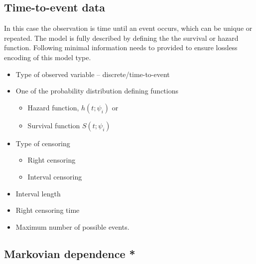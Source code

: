 %
%


\subsection{Time-to-event data}
In this case the observation is time until an event occurs, which can be unique or repeated.
The model is fully described by defining the the survival or hazard function. Following minimal information 
needs to provided to ensure lossless encoding of this model type.
\begin{itemize}
\item
Type of observed variable -- discrete/time-to-event
\item
One of the probability distribution defining functions
\begin{itemize}
\item
Hazard function, $h(t; \psi_i)$ or
\item
Survival function $S(t;\psi_i)$
\end{itemize}
\item
Type of censoring
\begin{itemize}
\item
Right censoring
\item
Interval censoring
\end{itemize}
\item
Interval length
\item
Right censoring time 
\item
Maximum number of possible events.
\end{itemize}


\subsection{Markovian dependence {\color{red} \scshape{*}}}
\label{subsec:markovian}

